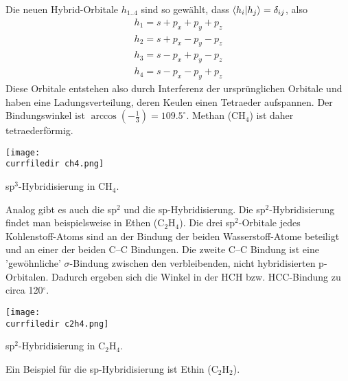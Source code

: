 Die neuen Hybrid-Orbitale $h_{1 .. 4}$ sind so gewählt, dass $\braket{h_i | h_j} = \delta_{ij}$, also
\begin{eqnarray}
 h_1 = s + p_x + p_y + p_z \\
 h_2 = s + p_x - p_y - p_z \\
 h_3 = s - p_x + p_y - p_z \\
 h_4 = s - p_x - p_y + p_z 
\end{eqnarray}
Diese Orbitale entstehen also durch Interferenz der ursprünglichen Orbitale und haben eine Ladungsverteilung, deren Keulen einen Tetraeder aufspannen. Der Bindungswinkel ist $\arccos (-\frac{1}{3}) = 109.5^\circ$. Methan (CH$_4$) ist daher tetraederförmig.
%
\begin{marginfigure}
\texttt{[image: \\currfiledir ch4.png]}
\caption{sp$^3$-Hybridisierung in CH$_4$. }
\end{marginfigure}
%


Analog gibt es auch die sp$^2$ und die sp-Hybridisierung.  Die sp$^2$-Hybridisierung findet man beispielsweise in Ethen (C$_2$H$_4$). Die drei  sp$^2$-Orbitale jedes Kohlenstoff-Atoms sind an der Bindung der beiden Wasserstoff-Atome beteiligt und an einer der beiden C--C Bindungen. Die zweite C--C Bindung ist eine 'gewöhnliche' $\sigma$-Bindung zwischen den verbleibenden, nicht hybridisierten p-Orbitalen. Dadurch ergeben sich die Winkel in der HCH bzw. HCC-Bindung zu circa 120$^\circ$.
%
\begin{marginfigure}
\texttt{[image: \\currfiledir c2h4.png]}
\caption{sp$^2$-Hybridisierung in C$_2$H$_4$. }
\end{marginfigure}
%

Ein Beispiel für die sp-Hybridisierung ist Ethin (C$_2$H$_2$).

\printbibliography[segment=\therefsegment,heading=subbibliography]
